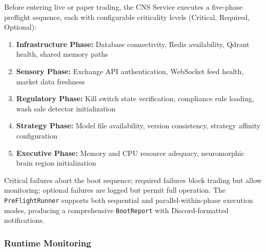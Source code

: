 \documentclass[12pt, a4paper]{article}
\begin{document}
Before entering live or paper trading, the CNS Service executes a five-phase preflight sequence, each with configurable criticality levels (Critical, Required, Optional):

\begin{enumerate}
	\item \textbf{Infrastructure Phase:} Database connectivity, Redis availability, Qdrant health, shared memory paths
	\item \textbf{Sensory Phase:} Exchange API authentication, WebSocket feed health, market data freshness
	\item \textbf{Regulatory Phase:} Kill switch state verification, compliance rule loading, wash sale detector initialization
	\item \textbf{Strategy Phase:} Model file availability, version consistency, strategy affinity configuration
	\item \textbf{Executive Phase:} Memory and CPU resource adequacy, neuromorphic brain region initialization
\end{enumerate}

Critical failures abort the boot sequence; required failures block trading but allow monitoring; optional failures are logged but permit full operation. The \texttt{PreFlightRunner} supports both sequential and parallel-within-phase execution modes, producing a comprehensive \texttt{BootReport} with Discord-formatted notifications.

\subsubsection{Runtime Monitoring}
\end{document}
